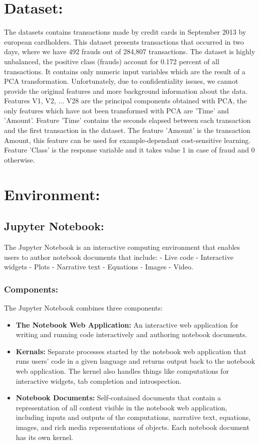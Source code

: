 \documentclass{report}
\begin{document}
\section{Dataset: }
The datasets contains transactions made by credit cards in September 2013 by european cardholders. This dataset presents transactions that occurred in two days, where we have 492 frauds out of 284,807 transactions. The dataset is highly unbalanced, the positive class (frauds) account for 0.172 percent of all transactions.
It contains only numeric input variables which are the result of a PCA transformation. Unfortunately, due to confidentiality issues, we cannot provide the original features and more background information about the data. Features V1, V2, ... V28 are the principal components obtained with PCA, the only features which have not been transformed with PCA are 'Time' and 'Amount'. Feature 'Time' contains the seconds elapsed between each transaction and the first transaction in the dataset. The feature 'Amount' is the transaction Amount, this feature can be used for example-dependant cost-sensitive learning. Feature 'Class' is the response variable and it takes value 1 in case of fraud and 0 otherwise.

\section{Environment: }
\subsection{Jupyter Notebook: }
The Jupyter Notebook is an interactive computing environment that enables users to author notebook documents that include: - Live code - Interactive widgets - Plots - Narrative text - Equations - Images - Video.

\subsubsection{Components: } The Jupyter Notebook combines three components:

\begin{itemize}
\item \textbf{The Notebook Web Application: } An interactive web application for writing and running code interactively and authoring notebook documents.

\item \textbf{Kernals: } Separate processes started by the notebook web application that runs users’ code in a given language and returns output back to the notebook web application. The kernel also handles things like computations for interactive widgets, tab completion and introspection.

\item \textbf{Notebook Documents: } Self-contained documents that contain a representation of all content visible in the notebook web application, including inputs and outputs of the computations, narrative text, equations, images, and rich media representations of objects. Each notebook document has its own kernel.

\end{itemize}
\end{document}
